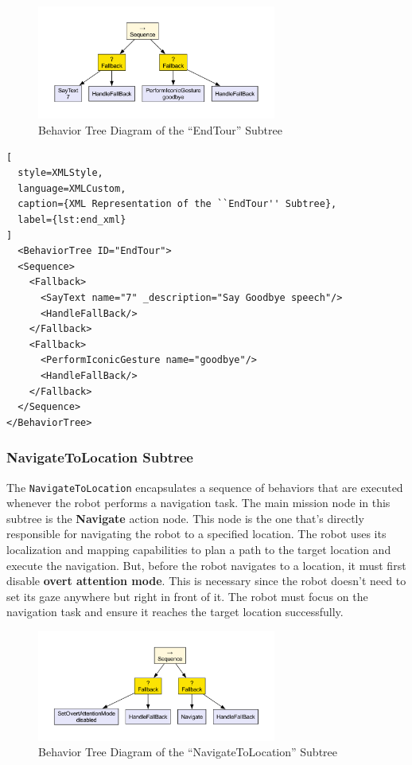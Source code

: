\documentclass{CSSRforAfrica}
\begin{document}
\begin{figure}[H]
  \centering
  \includegraphics[width=0.7\textwidth]{./diagrams/end.pdf}
  \caption{Behavior Tree Diagram of the ``EndTour'' Subtree}
  \label{fig:end_diagram}
\end{figure}
\bigskip

\begin{lstlisting}[
  style=XMLStyle, 
  language=XMLCustom, 
  caption={XML Representation of the ``EndTour'' Subtree},
  label={lst:end_xml}
]
  <BehaviorTree ID="EndTour">
  <Sequence>
    <Fallback>
      <SayText name="7" _description="Say Goodbye speech"/>
      <HandleFallBack/>
    </Fallback>
    <Fallback>
      <PerformIconicGesture name="goodbye"/>
      <HandleFallBack/>
    </Fallback>
  </Sequence>
</BehaviorTree>
\end{lstlisting}

\subsubsection{NavigateToLocation Subtree}
\label{section:navigate_to_location}

The \texttt{NavigateToLocation} encapsulates a sequence of behaviors that are executed whenever the robot performs a navigation task. The main mission node in this subtree is the \textbf{Navigate} action node. This node is the one that's directly responsible for navigating the robot to a specified location. The robot uses its localization and mapping capabilities to plan a path to the target location and execute the navigation.
But, before the robot navigates to a location, it must first disable \textbf{overt attention mode}. This is necessary since the robot doesn't need to set its gaze anywhere but right in front of it. The robot must focus on the navigation task and ensure it reaches the target location successfully.
\begin{figure}[H]
  \centering
  \includegraphics[width=0.7\textwidth]{./diagrams/navigate.pdf}
  \caption{Behavior Tree Diagram of the ``NavigateToLocation'' Subtree}
  \label{fig:navigate_diagram}
\end{figure}
\end{document}
